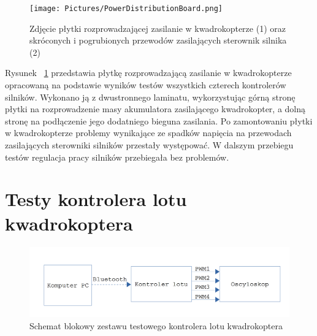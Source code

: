 \begin{figure}[H]
	\centering
	\texttt{[image: Pictures/PowerDistributionBoard.png]}
	\caption[Zdjęcie płytki rozprowadzającej zasilanie w kwadrokopterze (1) oraz skróconych i pogrubionych przewodów zasilających sterownik silnika (2)]{Zdjęcie płytki rozprowadzającej zasilanie w kwadrokopterze (1) oraz skróconych i pogrubionych przewodów zasilających sterownik silnika (2)}
	\label{fig:PowerDistribudionBoard}
\end{figure}

Rysunek ~\ref{fig:PowerDistribudionBoard} przedstawia płytkę rozprowadzającą zasilanie w kwadrokopterze opracowaną na podstawie wyników testów wszystkich czterech kontrolerów silników. Wykonano ją z dwustronnego laminatu, wykorzystując górną stronę płytki na rozprowadzenie masy akumulatora zasilającego kwadrokopter, a dolną stronę na podłączenie jego dodatniego bieguna zasilania. Po zamontowaniu płytki w kwadrokopterze problemy wynikające ze spadków napięcia na przewodach zasilających sterowniki silników przestały występować. W dalszym przebiegu testów regulacja pracy silników przebiegała bez problemów.

\section{Testy kontrolera lotu kwadrokoptera}

\begin{figure}[H]
	\centering
	\includegraphics[scale=0.2]{Pictures/QuadrotorController_test.png}
	\caption[Schemat blokowy zestawu testowego kontrolera lotu kwadrokoptera]{Schemat blokowy zestawu testowego kontrolera lotu kwadrokoptera}
	\label{fig:QuadrotorController_test}
\end{figure}

